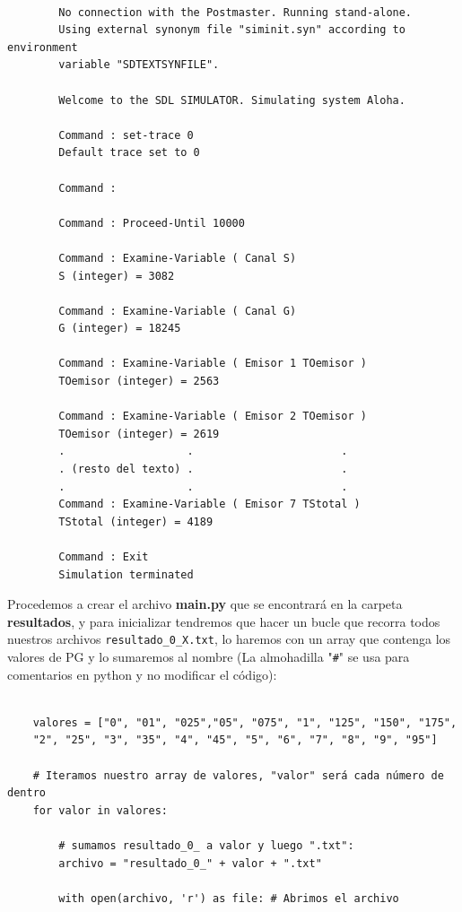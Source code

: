 \documentclass{article}
\begin{document}
\begin{center} 
    \begin{verbatim}

        No connection with the Postmaster. Running stand-alone.
        Using external synonym file "siminit.syn" according to environment 
        variable "SDTEXTSYNFILE".
        
        Welcome to the SDL SIMULATOR. Simulating system Aloha.
        
        Command : set-trace 0
        Default trace set to 0
        
        Command : 
        
        Command : Proceed-Until 10000
        
        Command : Examine-Variable ( Canal S) 
        S (integer) = 3082
        
        Command : Examine-Variable ( Canal G) 
        G (integer) = 18245
        
        Command : Examine-Variable ( Emisor 1 TOemisor )
        TOemisor (integer) = 2563
        
        Command : Examine-Variable ( Emisor 2 TOemisor )
        TOemisor (integer) = 2619
        .                   .                       .
        . (resto del texto) .                       .
        .                   .                       .
        Command : Examine-Variable ( Emisor 7 TStotal )
        TStotal (integer) = 4189
        
        Command : Exit
        Simulation terminated

    \end{verbatim}
    \end{center} 
\quad

Procedemos a crear el archivo \textbf{main.py} que se encontrará en la carpeta \textbf{resultados}, y para inicializar tendremos que hacer un bucle que recorra todos nuestros archivos \verb|resultado_0_X.txt|, lo haremos con un array que contenga los valores de PG y lo sumaremos al nombre (La almohadilla "\verb|#|" se usa para comentarios en python y no modificar el código):

\quad 
\begin{center} 
    \begin{verbatim}

    valores = ["0", "01", "025","05", "075", "1", "125", "150", "175",
    "2", "25", "3", "35", "4", "45", "5", "6", "7", "8", "9", "95"]

    # Iteramos nuestro array de valores, "valor" será cada número de dentro
    for valor in valores:

        # sumamos resultado_0_ a valor y luego ".txt":
        archivo = "resultado_0_" + valor + ".txt"

        with open(archivo, 'r') as file: # Abrimos el archivo

    \end{verbatim}
    \end{center} 
\quad
\end{document}
